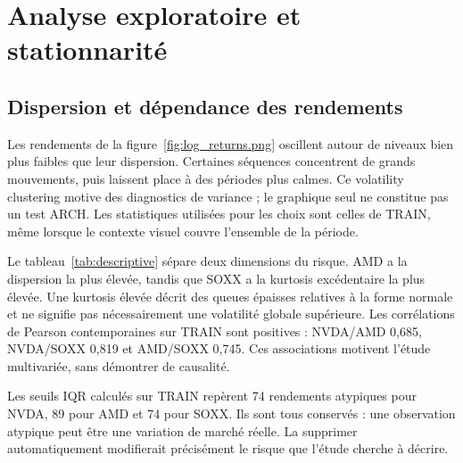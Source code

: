 \section{Analyse exploratoire et stationnarité}
\label{sec:eda}

\subsection{Dispersion et dépendance des rendements}






Les rendements de la figure~\ref{fig:log_returns.png} oscillent autour de niveaux bien plus faibles que leur dispersion. Certaines séquences concentrent de grands mouvements, puis laissent place à des périodes plus calmes. Ce volatility clustering motive des diagnostics de variance ; le graphique seul ne constitue pas un test ARCH. Les statistiques utilisées pour les choix sont celles de TRAIN, même lorsque le contexte visuel couvre l’ensemble de la période.







Le tableau~\ref{tab:descriptive} sépare deux dimensions du risque. AMD a la dispersion la plus élevée, tandis que SOXX a la kurtosis excédentaire la plus élevée. Une kurtosis élevée décrit des queues épaisses relatives à la forme normale et ne signifie pas nécessairement une volatilité globale supérieure. Les corrélations de Pearson contemporaines sur TRAIN sont positives : NVDA/AMD 0,685, NVDA/SOXX 0,819 et AMD/SOXX 0,745. Ces associations motivent l’étude multivariée, sans démontrer de causalité.



Les seuils IQR calculés sur TRAIN repèrent 74 rendements atypiques pour NVDA, 89 pour AMD et 74 pour SOXX. Ils sont tous conservés : une observation atypique peut être une variation de marché réelle. La supprimer automatiquement modifierait précisément le risque que l’étude cherche à décrire.

